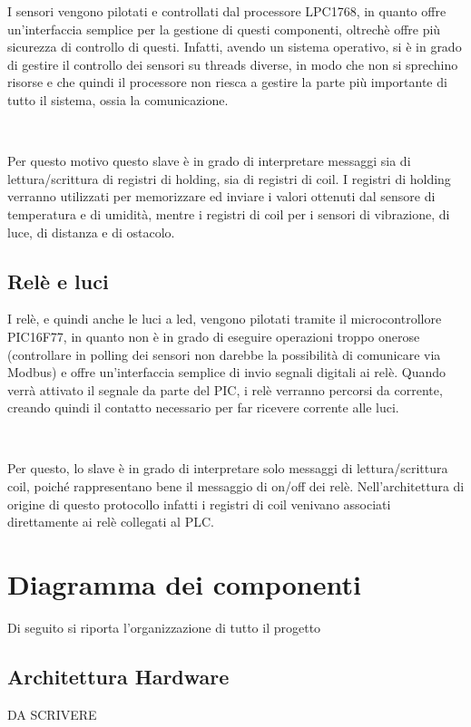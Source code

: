 \documentclass[a4paper,titlepage]{book}
\begin{document}
I sensori vengono pilotati e controllati dal processore LPC1768, in quanto offre un'interfaccia semplice per la gestione di questi componenti, oltrechè offre più sicurezza di controllo di questi. Infatti, avendo un sistema operativo, si è in grado di gestire il controllo dei sensori su threads diverse, in modo che non si sprechino risorse e che quindi il processore non riesca a gestire la parte più importante di tutto il sistema, ossia la comunicazione.

~

Per questo motivo questo slave è in grado di interpretare messaggi sia di lettura/scrittura di registri di holding, sia di registri di coil. I registri di holding verranno utilizzati per memorizzare ed inviare i valori ottenuti dal sensore di temperatura e di umidità, mentre i registri di coil per i sensori di vibrazione, di luce, di distanza e di ostacolo.

\subsection{Relè e luci}

I relè, e quindi anche le luci a led, vengono pilotati tramite il microcontrollore PIC16F77, in quanto non è in grado di eseguire operazioni troppo onerose (controllare in polling dei sensori non darebbe la possibilità di comunicare via Modbus) e offre un'interfaccia semplice di invio segnali digitali ai relè. Quando verrà attivato il segnale da parte del PIC, i relè verranno percorsi da corrente, creando quindi il contatto necessario per far ricevere corrente alle luci.

~

Per questo, lo slave è in grado di interpretare solo messaggi di lettura/scrittura coil, poiché rappresentano bene il messaggio di on/off dei relè. Nell'architettura di origine di questo protocollo infatti i registri di coil venivano associati direttamente ai relè collegati al PLC. 


\section{Diagramma dei componenti}

Di seguito si riporta l'organizzazione di tutto il progetto

\subsection{Architettura Hardware}
DA SCRIVERE
\end{document}
